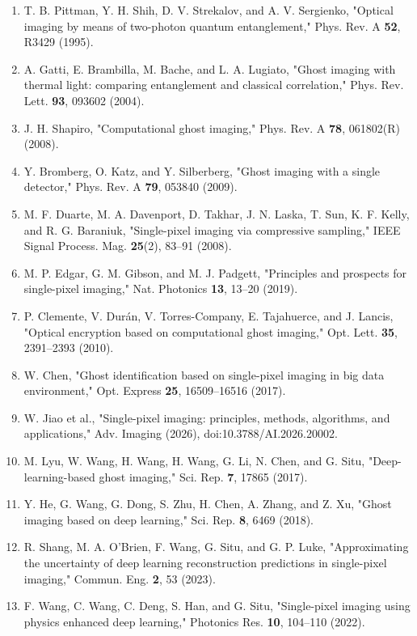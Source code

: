 \documentclass[11pt]{article}
\begin{document}
\begin{enumerate}
\item T. B. Pittman, Y. H. Shih, D. V. Strekalov, and A. V. Sergienko, "Optical imaging by means of two-photon quantum entanglement," Phys. Rev. A \textbf{52}, R3429 (1995).
\item A. Gatti, E. Brambilla, M. Bache, and L. A. Lugiato, "Ghost imaging with thermal light: comparing entanglement and classical correlation," Phys. Rev. Lett. \textbf{93}, 093602 (2004).
\item J. H. Shapiro, "Computational ghost imaging," Phys. Rev. A \textbf{78}, 061802(R) (2008).
\item Y. Bromberg, O. Katz, and Y. Silberberg, "Ghost imaging with a single detector," Phys. Rev. A \textbf{79}, 053840 (2009).
\item M. F. Duarte, M. A. Davenport, D. Takhar, J. N. Laska, T. Sun, K. F. Kelly, and R. G. Baraniuk, "Single-pixel imaging via compressive sampling," IEEE Signal Process. Mag. \textbf{25}(2), 83--91 (2008).
\item M. P. Edgar, G. M. Gibson, and M. J. Padgett, "Principles and prospects for single-pixel imaging," Nat. Photonics \textbf{13}, 13--20 (2019).
\item P. Clemente, V. Durán, V. Torres-Company, E. Tajahuerce, and J. Lancis, "Optical encryption based on computational ghost imaging," Opt. Lett. \textbf{35}, 2391--2393 (2010).
\item W. Chen, "Ghost identification based on single-pixel imaging in big data environment," Opt. Express \textbf{25}, 16509--16516 (2017).
\item W. Jiao et al., "Single-pixel imaging: principles, methods, algorithms, and applications," Adv. Imaging (2026), doi:10.3788/AI.2026.20002.
\item M. Lyu, W. Wang, H. Wang, H. Wang, G. Li, N. Chen, and G. Situ, "Deep-learning-based ghost imaging," Sci. Rep. \textbf{7}, 17865 (2017).
\item Y. He, G. Wang, G. Dong, S. Zhu, H. Chen, A. Zhang, and Z. Xu, "Ghost imaging based on deep learning," Sci. Rep. \textbf{8}, 6469 (2018).
\item R. Shang, M. A. O'Brien, F. Wang, G. Situ, and G. P. Luke, "Approximating the uncertainty of deep learning reconstruction predictions in single-pixel imaging," Commun. Eng. \textbf{2}, 53 (2023).
\item F. Wang, C. Wang, C. Deng, S. Han, and G. Situ, "Single-pixel imaging using physics enhanced deep learning," Photonics Res. \textbf{10}, 104--110 (2022).

\end{enumerate}
\end{document}
